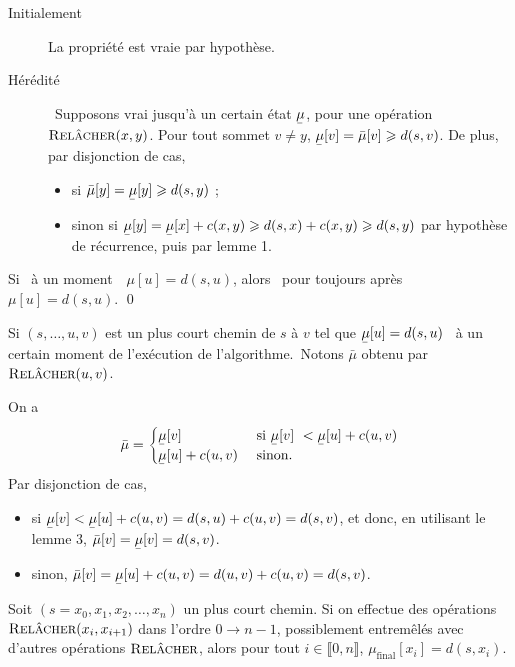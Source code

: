 \documentclass[a4paper]{article}
\begin{document}
	\begin{prv}
		\begin{description}
			\item[Initialement] La propriété est vraie par hypothèse.
			\item[Hérédité] Supposons vrai jusqu'à un certain état $\ubar\mu$, pour une opération $\textsc{Relâcher}(x,y)$.
				Pour tout sommet $v \neq y$, $\ubar\mu[v] = \bar\mu[v] \ge d(s,v)$.
				De plus, par disjonction de cas,
				\begin{itemize}
					\item si $\bar\mu[y] = \ubar\mu[y] \ge d(s,y)$ ;
					\item sinon si $\ubar\mu[y] = \ubar\mu[x] + c(x,y) \ge d(s,x) + c(x,y) \ge d(s,y)$ par hypothèse de récurrence, puis par lemme 1.
				\end{itemize}
		\end{description}
	\end{prv}

	\begin{crlr}
		Si \guillemotleft~à un moment~\guillemotright\ $\mu[u] = d(s,u)$, alors \guillemotleft~pour toujours après~\guillemotright\ $\mu[u] = d(s,u)$.
		\qed
	\end{crlr}

	\begin{numlem}
		Si $(s, \ldots, u, v)$ est un plus court chemin de $s$ à $v$ tel que $\ubar\mu[u] = d(s,u)$ \guillemotleft~à un certain moment de l'exécution de l'algorithme.~\guillemotright\@ Notons $\bar\mu$ obtenu par $\textsc{Relâcher}(u,v)$.
	\end{numlem}

	\begin{prv}
		On a \[
			\bar\mu = \begin{cases}
				\ubar\mu[v] & \text{ si } \ubar\mu[v] < \ubar\mu[u] + c(u,v)\\
				\ubar\mu[u] + c(u,v) &\text{ sinon}.
			\end{cases}
		\]Par disjonction de cas,
		\begin{itemize}
			\item si $\ubar\mu[v] < \ubar\mu[u] + c(u,v) = d(s, u) + c(u,v) = d(s,v)$, et donc, en utilisant le lemme 3, $\bar\mu[v] = \ubar\mu[v] = d(s,v)$.
			\item sinon, $\bar\mu[v] = \ubar\mu[u] + c(u,v) = d(u,v) + c(u, v) = d(s,v)$.
		\end{itemize}
	\end{prv}

	\begin{numlem}
		Soit $(s=x_0, x_1, x_2, \ldots, x_n)$ un plus court chemin. Si on effectue des opérations \hbox{$\textsc{Relâcher}(x_i, x_{i+1})$} dans l'ordre $0 \to n - 1$, possiblement entremêlés avec d'autres opérations $\textsc{Relâcher}$, alors pour tout $i \in \llbracket 0,n \rrbracket$, $\mu_{\text{final}}[x_i] = d(s, x_i)$.
	\end{numlem}
\end{document}
